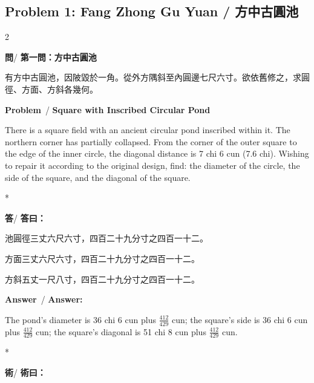 \documentclass[11pt,a4paper]{article}
\newcommand{\wen}{\textbf{\color{sectioncolor}問}}
\newcommand{\da}{\textbf{\color{answercolor}答}}
\newcommand{\shu}{\textbf{\color{methodcolor}術}}
\newcommand{\prb}{\textbf{\color{sectioncolor}Problem}}
\newcommand{\ans}{\textbf{\color{answercolor}Answer}}
\begin{document}
\vspace{0.5em}

\subsection*{Problem 1: Fang Zhong Gu Yuan / 方中古圓池}

\begin{paracol}{2}

\begin{leftcolumn*}
\wen / \textbf{第一問：方中古圓池}

有方中古圓池，因陂毀於一角。從外方隅斜至內圓邊七尺六寸。欲依舊修之，求圓徑、方面、方斜各幾何。
\end{leftcolumn*}

\begin{rightcolumn}
\prb\ / \textbf{Square with Inscribed Circular Pond}

There is a square field with an ancient circular pond 
inscribed within it. The northern corner has partially collapsed. From the 
corner of the outer square to the edge of the inner circle, the diagonal 
distance is 7 chi 6 cun (7.6 chi). Wishing to repair it according to 
the original design, find: the diameter of the circle, the side of the 
square, and the diagonal of the square.
\end{rightcolumn}

\switchcolumn[0]*

\begin{leftcolumn*}
\da / \textbf{答曰：}

池圓徑三丈六尺六寸，四百二十九分寸之四百一十二。

方面三丈六尺六寸，四百二十九分寸之四百一十二。

方斜五丈一尺八寸，四百二十九分寸之四百一十二。
\end{leftcolumn*}

\begin{rightcolumn}
\ans\ / \textbf{Answer:}

The pond's diameter is 36 chi 6 cun plus $\frac{412}{429}$ cun; 
the square's side is 36 chi 6 cun plus $\frac{412}{429}$ cun; the square's 
diagonal is 51 chi 8 cun plus $\frac{412}{429}$ cun.
\end{rightcolumn}

\switchcolumn[0]*

\begin{leftcolumn*}
\shu / \textbf{術曰：}


\end{leftcolumn*}
\end{paracol}
\end{document}
